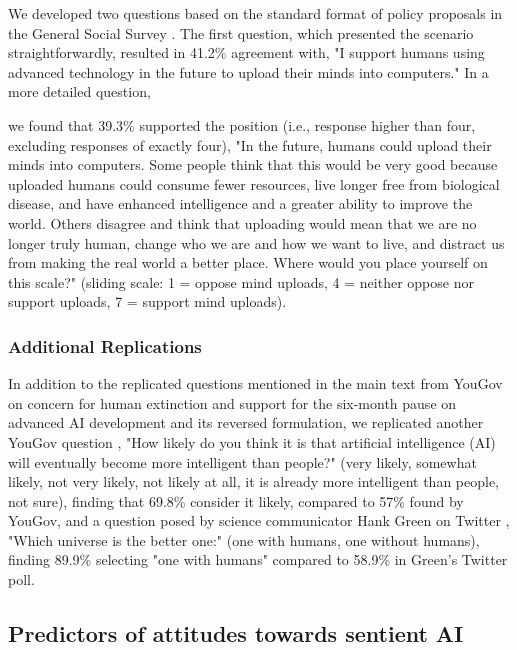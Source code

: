 \documentclass[manuscript,screen,review,nonacm]{acmart}
\begin{document}
We developed two questions based on the standard format of policy proposals in the General Social Survey \cite{smith18}. The first question, which presented the scenario straightforwardly, resulted in 41.2\% agreement with, "I support humans using advanced technology in the future to upload their minds into computers." In a more detailed question,

\noindent we found that 39.3\% supported the position (i.e., response higher than four, excluding responses of exactly four), "In the future, humans could upload their minds into computers. Some people think that this would be very good because uploaded humans could consume fewer resources, live longer free from biological disease, and have enhanced intelligence and a greater ability to improve the world. Others disagree and think that uploading would mean that we are no longer truly human, change who we are and how we want to live, and distract us from making the real world a better place. Where would you place yourself on this scale?" (sliding scale: 1 = oppose mind uploads, 4 = neither oppose nor support uploads, 7 = support mind uploads).

\subsubsection{Additional Replications}

In addition to the replicated questions mentioned in the main text from YouGov on concern for human extinction \cite{yougov23} and support for the six-month pause on advanced AI development \cite{yougov23c} and its reversed formulation, we replicated another YouGov question \cite{yougov23b}, "How likely do you think it is that artificial intelligence (AI) will eventually become more intelligent than people?" (very likely, somewhat likely, not very likely, not likely at all, it is already more intelligent than people, not sure), finding that 69.8\% consider it likely, compared to 57\% found by YouGov, and a question posed by science communicator Hank Green on Twitter \cite{green23}, "Which universe is the better one:" (one with humans, one without humans), finding 89.9\% selecting "one with humans" compared to 58.9\% in Green's Twitter poll.

\subsection{Predictors of attitudes towards sentient AI}
\label{sec:predictors}
\end{document}

